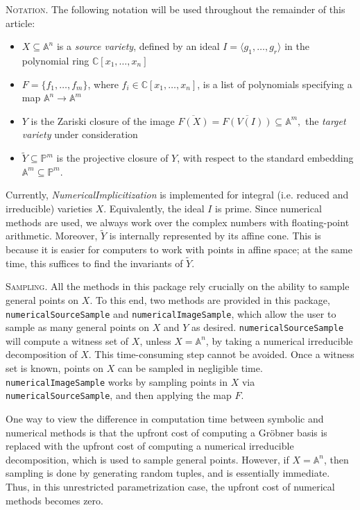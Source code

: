 \documentclass[letter]{amsart}
\theoremstyle{definition}
\begin{document}
\noindent
\textsc{Notation.} The following notation will be used throughout the remainder of this article: 
\begin{itemize}
\item $X \subseteq {\mathbb{A}}^n$ is a \textit{source variety}, defined by an ideal $I = \langle g_{1}, \ldots, g_{r} \rangle$ in the polynomial ring ${\mathbb{C}}[x_1, \ldots, x_n]$
\item $F = \{f_1, \ldots, f_m\}$, where $f_i \in {\mathbb{C}}[x_1, \ldots, x_n]$, is a list of polynomials specifying a map ${\mathbb{A}}^{n} \to {\mathbb{A}}^{m}$
\item $Y$ is the Zariski closure of the image $\overline{F(X)} = \overline{F(V(I))} \subseteq {\mathbb{A}}^{m},$ the \textit{target variety} under consideration
\item $\widetilde{Y} \subseteq {\mathbb{P}}^{m}$ is the projective closure of $Y$, with respect to the standard embedding ${\mathbb{A}}^{m} \subseteq {\mathbb{P}}^{m}$.
\end{itemize}

Currently, \textit{NumericalImplicitization} is implemented for integral (i.e. reduced and irreducible) varieties $X$.  Equivalently, the ideal $I$ is prime. Since numerical methods are used, we always work over the complex numbers with floating-point arithmetic. Moreover, $\widetilde{Y}$ is internally represented by its affine cone. This is because it is easier for computers to work with points in affine space; at the same time, this suffices to find the invariants of $\widetilde{Y}$.
\vspace{0.3cm}

\noindent
\textsc{Sampling.} All the methods in this package rely crucially on the ability to sample general points on $X$. To this end, two methods are provided in this package, {\tt{numericalSourceSample}} and {\tt{numericalImageSample}}, which allow the user to sample as many general points on $X$ and $Y$ as desired. {\tt{numericalSourceSample}} will compute a witness set of $X$, unless $X = {\mathbb{A}}^n$, by taking a numerical irreducible decomposition of $X$.  This time-consuming step cannot be avoided. Once a witness set is known, points on $X$ can be sampled in negligible time. {\tt{numericalImageSample}} works by sampling points in $X$ via {\tt{numericalSourceSample}}, and then applying the map $F$.

One way to view the difference in computation time between symbolic and numerical methods is that the upfront cost of computing a Gr\"obner basis is replaced with the upfront cost of computing a numerical irreducible decomposition, which is used to sample general points. However, if $X = {\mathbb{A}}^n$, then sampling is done by generating random tuples, and is essentially immediate. Thus, in this unrestricted parametrization case, the upfront cost of numerical methods becomes zero.
\vspace{0.4cm}
\end{document}
